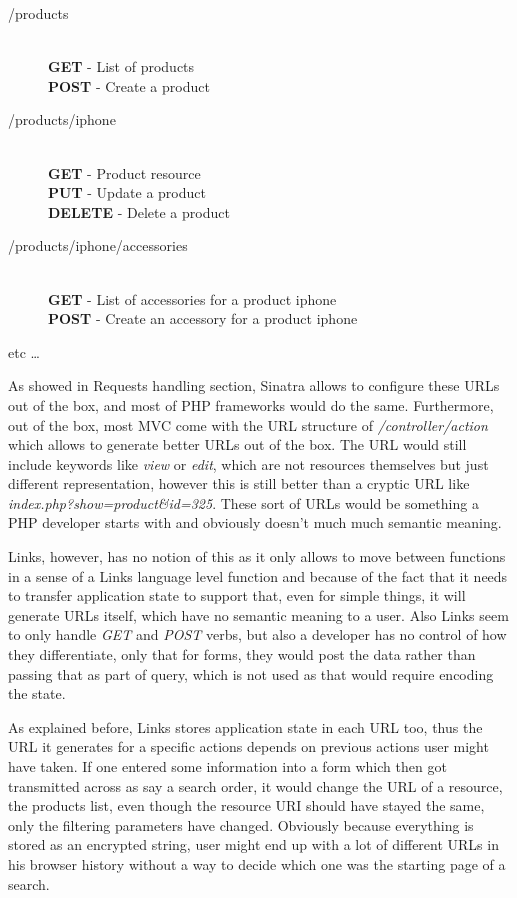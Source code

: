 \begin{description}
  \item[/products] \hfill \\
  \textbf{GET}     - List of products \\
  \textbf{POST}    - Create a product
  \item[/products/iphone] \hfill \\
  \textbf{GET}     - Product resource \\
  \textbf{PUT}     - Update a product \\
  \textbf{DELETE}  - Delete a product
  \item[/products/iphone/accessories] \hfill \\
  \textbf{GET}     - List of accessories for a product iphone \\
  \textbf{POST}    - Create an accessory for a product iphone
  \item[etc \ldots]
\end{description}

As showed in Requests handling section, Sinatra allows to configure these URLs out of the box, and most of PHP frameworks would do the same. Furthermore, out of the box, most MVC come with the URL structure of \textit{/controller/action} which allows to generate better URLs out of the box. The URL would still include keywords like \textit{view} or \textit{edit}, which are not resources themselves but just different representation, however this is still better than a cryptic URL like \textit{index.php?show=product\&id=325}. These sort of URLs would be something a PHP developer starts with and obviously doesn't much much semantic meaning.

Links, however, has no notion of this as it only allows to move between functions in a sense of a Links language level function and because of the fact that it needs to transfer application state to support that, even for simple things, it will generate URLs itself, which have no semantic meaning to a user. Also Links seem to only handle \textit{GET} and \textit{POST} verbs, but also a developer has no control of how they differentiate, only that for forms, they would post the data rather than passing that as part of query, which is not used as that would require encoding the state.

As explained before, Links stores application state in each URL too, thus the URL it generates for a specific actions depends on previous actions user might have taken. If one entered some information into a form which then got transmitted across as say a search order, it would change the URL of a resource, the products list, even though the resource URI should have stayed the same, only the filtering parameters have changed. Obviously because everything is stored as an encrypted string, user might end up with a lot of different URLs in his browser history without a way to decide which one was the starting page of a search.

